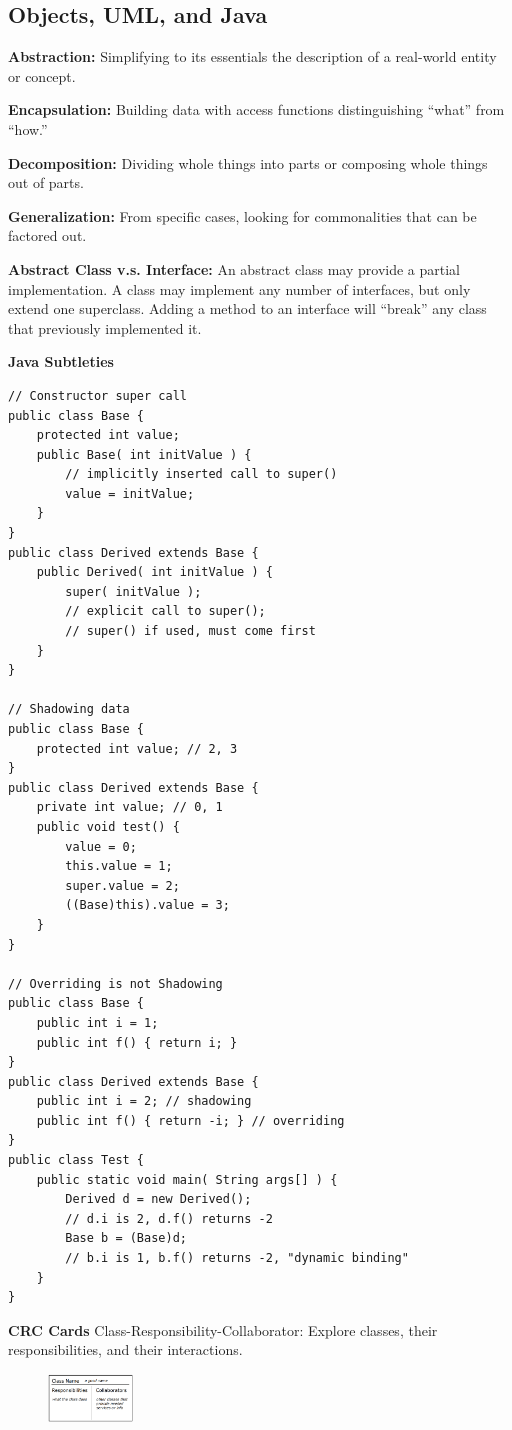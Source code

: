 \documentclass[8pt, letterpaper, titlepage]{article}
\begin{document}
\begin{multicols*}{2}
\footnotesize
\subsection*{Objects, UML, and Java}
\textbf{Abstraction:} Simplifying to its essentials the description of a real-world entity or concept.

\textbf{Encapsulation:} Building data with access functions distinguishing ``what'' from ``how.''

\textbf{Decomposition:} Dividing whole things into parts or composing whole things out of parts.

\textbf{Generalization:} From specific cases, looking for commonalities that can be factored out.

\textbf{Abstract Class v.s. Interface:} An abstract class may provide a partial implementation. A class may implement any number of interfaces, but only extend one superclass. Adding a method to an interface will ``break'' any class that  previously implemented it.

\textbf{Java Subtleties}
\begin{lstlisting}[basicstyle=\footnotesize\ttfamily]
// Constructor super call
public class Base {
    protected int value;
    public Base( int initValue ) {
        // implicitly inserted call to super()
        value = initValue;
    }
}
public class Derived extends Base {
    public Derived( int initValue ) {
        super( initValue );
        // explicit call to super();
        // super() if used, must come first
    }
}

// Shadowing data
public class Base {
    protected int value; // 2, 3
}
public class Derived extends Base {
    private int value; // 0, 1
    public void test() {
        value = 0;
        this.value = 1;
        super.value = 2;
        ((Base)this).value = 3;
    }
} 

// Overriding is not Shadowing
public class Base {
    public int i = 1;
    public int f() { return i; }
}
public class Derived extends Base {
    public int i = 2; // shadowing
    public int f() { return -i; } // overriding
}
public class Test {
    public static void main( String args[] ) {
        Derived d = new Derived();
        // d.i is 2, d.f() returns -2
        Base b = (Base)d;
        // b.i is 1, b.f() returns -2, "dynamic binding"
    }
}
\end{lstlisting}

\textbf{CRC Cards}
Class-Responsibility-Collaborator: Explore classes, their responsibilities, and their interactions.
\begin{figure}[H]
    \centering
    \includegraphics[width=0.2\textwidth]{CRC.png}
\end{figure}


\end{multicols*}
\end{document}
